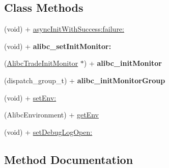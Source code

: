 \subsection*{Class Methods}
\begin{DoxyCompactItemize}
\item 
(void) + \mbox{\hyperlink{interface_alibc_trade_common_s_d_k_a6a1af045551eec7da7a2da92886ad05f}{async\+Init\+With\+Success\+:failure\+:}}
\item 
\mbox{\label{interface_alibc_trade_common_s_d_k_ad261c6a52caad477278b230c6fd5fe71}} 
(void) + {\bfseries alibc\+\_\+set\+Init\+Monitor\+:}
\item 
\mbox{\label{interface_alibc_trade_common_s_d_k_a53ab025047db524937701ea60c1f39a3}} 
(\mbox{\hyperlink{interface_alibc_trade_init_monitor}{Alibc\+Trade\+Init\+Monitor}} $\ast$) + {\bfseries alibc\+\_\+init\+Monitor}
\item 
\mbox{\label{interface_alibc_trade_common_s_d_k_a9dd9bc766af9caccf81ad5edc27e6112}} 
(dispatch\+\_\+group\+\_\+t) + {\bfseries alibc\+\_\+init\+Monitor\+Group}
\item 
(void) + \mbox{\hyperlink{interface_alibc_trade_common_s_d_k_a780956aef5009a4b6fcbe3fc9f63f598}{set\+Env\+:}}
\item 
(Alibc\+Environment) + \mbox{\hyperlink{interface_alibc_trade_common_s_d_k_a52fffd9cecf92db99a9c187677a531da}{get\+Env}}
\item 
(void) + \mbox{\hyperlink{interface_alibc_trade_common_s_d_k_a078b422151a1f58252df135495ca6672}{set\+Debug\+Log\+Open\+:}}
\end{DoxyCompactItemize}


\subsection{Method Documentation}
\mbox{\label{interface_alibc_trade_common_s_d_k_a6a1af045551eec7da7a2da92886ad05f}} 
